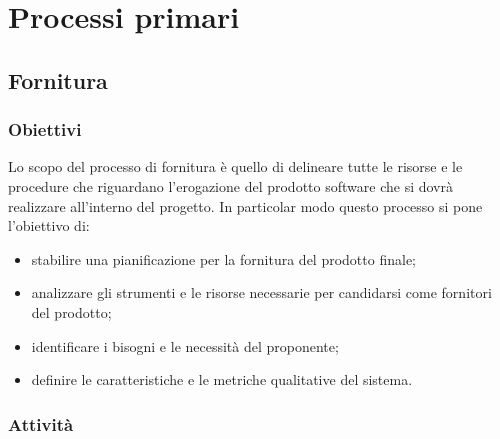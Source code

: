 \section{Processi primari}
\subsection{Fornitura}
\subsubsection{Obiettivi}
Lo scopo del processo di fornitura è quello di delineare tutte le risorse e le procedure che riguardano l'erogazione del prodotto software che si dovrà realizzare all'interno del progetto. In particolar modo questo processo si pone l'obiettivo di:
\begin{itemize}
	\item stabilire una pianificazione per la fornitura del prodotto finale;
	\item analizzare gli strumenti e le risorse necessarie per candidarsi come fornitori del prodotto;
	\item identificare i bisogni e le necessità del proponente;
	\item definire le caratteristiche e le metriche qualitative del sistema.
\end{itemize}

\subsubsection{Attività}
